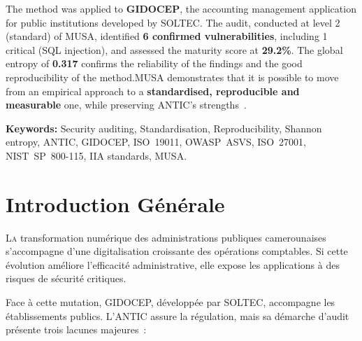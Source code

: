 \documentclass[12pt,a4paper,oneside]{report}
\begin{document}
\medskip
The method was applied to \textbf{GIDOCEP}, the accounting management
application for public institutions developed by SOLTEC. The audit,
conducted at level 2 (standard) of MUSA, identified \textbf{6 confirmed
	vulnerabilities}, including 1 critical (SQL injection), and assessed
the maturity score at \textbf{29.2\%}. The global entropy of
\textbf{0.317} confirms the reliability of the findings and the
good reproducibility of the method.MUSA demonstrates that it is possible to move from an empirical approach
to a \textbf{standardised, reproducible and measurable} one, while
preserving ANTIC's strengths~.

\vspace{0.5cm}
\begin{goldbox}
	\noindent\textbf{Keywords:} Security auditing, Standardisation,
	Reproducibility, Shannon entropy, ANTIC, GIDOCEP, ISO~19011,
	OWASP~ASVS, ISO~27001, NIST~SP~800-115, IIA standards, MUSA.
\end{goldbox}
\newpage
\pagestyle{plain}
\tableofcontents
\clearpage
{}
\listoffigures
\newpage
{}
\listoftables
\newpage

\clearpage
{}
\setcounter{page}{1}
\pagestyle{fancy}

\chapter*{Introduction G\'en\'erale}

\lettrine[lines=3,lhang=0.1,loversize=0.1]{\color{navy}L}{a} transformation
num\'erique des administrations publiques camerounaises s'accompagne d'une
digitalisation croissante des op\'erations comptables. Si cette \'evolution
am\'eliore l'efficacit\'e administrative, elle expose les applications \`a des
risques de s\'ecurit\'e critiques.

Face \`a cette mutation, GIDOCEP, d\'evelopp\'ee par SOLTEC, accompagne les
\'etablissements publics. L'ANTIC assure la r\'egulation, mais sa d\'emarche
d'audit pr\'esente trois lacunes majeures~:
\end{document}

